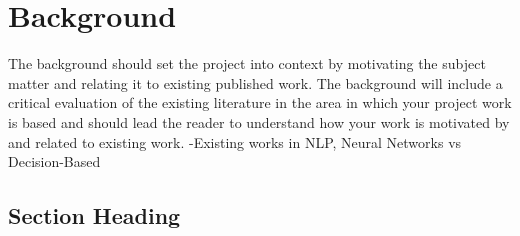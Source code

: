 \chapter{Background}
The background should set the project into context by motivating the subject matter and relating it to existing published work. The background will include a critical evaluation of the existing literature in the area in which your project work is based and should lead the reader to understand how your work is motivated by and related to existing work.
-Existing works in NLP, Neural Networks vs Decision-Based

\section{Section Heading}